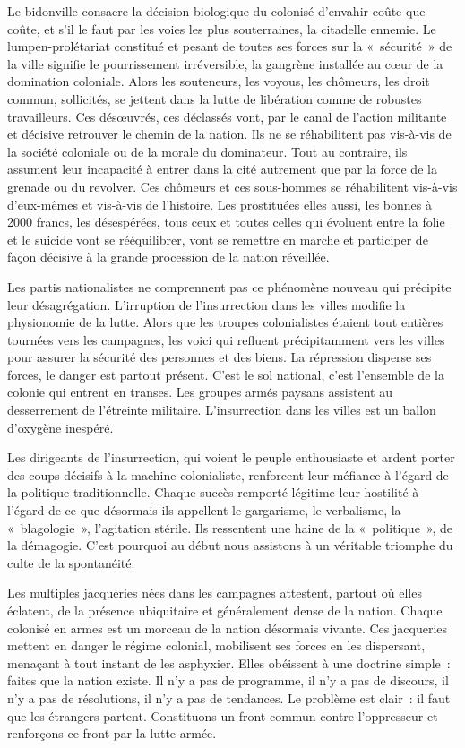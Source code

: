 \documentclass[french,twoside]{book} %
\begin{document}
Le bidonville consacre la décision biologique du colonisé d’envahir coûte que coûte, et s’il le faut par les voies les plus souterraines, la citadelle ennemie. Le lumpen-prolétariat constitué et pesant de toutes ses forces sur la « sécurité » de la ville signifie le pourrissement irréversible, la gangrène installée au cœur de la domination coloniale. Alors les souteneurs, les voyous, les chômeurs, les droit commun, sollicités, se jettent dans la lutte de libération comme de robustes travailleurs. Ces désœuvrés, ces déclassés vont, par le canal de l’action militante et décisive retrouver le chemin de la nation. Ils ne se réhabilitent pas vis-à-vis de la société coloniale ou de la morale du dominateur. Tout au contraire, ils assument leur incapacité à entrer dans la cité autrement que par la force de la grenade ou du revolver. Ces chômeurs et ces sous-hommes se réhabilitent vis-à-vis d’eux-mêmes et vis-à-vis de l’histoire. Les prostituées elles aussi, les bonnes à 2000 francs, les désespérées, tous ceux et toutes celles qui évoluent entre la folie et le suicide vont se rééquilibrer, vont se remettre en marche et participer de façon décisive à la grande procession de la nation réveillée.\par
Les partis nationalistes ne comprennent pas ce phénomène nouveau qui précipite leur désagrégation. L’irruption de l’insurrection dans les villes modifie la physionomie de la lutte. Alors que les troupes colonialistes étaient tout entières tournées vers les campagnes, les voici qui refluent précipitamment vers les   villes pour assurer la sécurité des personnes et des biens. La répression disperse ses forces, le danger est partout présent. C’est le sol national, c’est l’ensemble de la colonie qui entrent en transes. Les groupes armés paysans assistent au desserrement de l’étreinte militaire. L’insurrection dans les villes est un ballon d’oxygène inespéré.\par
Les dirigeants de l’insurrection, qui voient le peuple enthousiaste et ardent porter des coups décisifs à la machine colonialiste, renforcent leur méfiance à l’égard de la politique traditionnelle. Chaque succès remporté légitime leur hostilité à l’égard de ce que désormais ils appellent le gargarisme, le verbalisme, la « blagologie », l’agitation stérile. Ils ressentent une haine de la « politique », de la démagogie. C’est pourquoi au début nous assistons à un véritable triomphe du culte de la spontanéité.\par
Les multiples jacqueries nées dans les campagnes attestent, partout où elles éclatent, de la présence ubiquitaire et généralement dense de la nation. Chaque colonisé en armes est un morceau de la nation désormais vivante. Ces jacqueries mettent en danger le régime colonial, mobilisent ses forces en les dispersant, menaçant à tout instant de les asphyxier. Elles obéissent à une doctrine simple : faites que la nation existe. Il n’y a pas de programme, il n’y a pas de discours, il n’y a pas de résolutions, il n’y a pas de tendances. Le problème est clair : il faut que les étrangers partent. Constituons un front commun contre l’oppresseur et renforçons ce front par la lutte armée.\par
\end{document}
